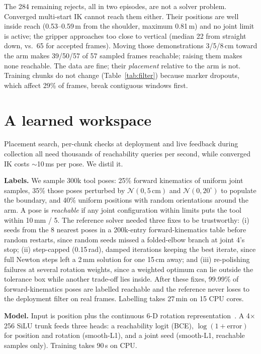 \documentclass[10pt,twocolumn]{article}
\begin{document}
The 284 remaining rejects, all in two episodes, are not a solver problem.
Converged multi-start IK cannot reach them either. Their positions are well
inside reach (0.53--0.59\,m from the shoulder, maximum 0.81\,m) and no joint
limit is active; the gripper approaches too close to vertical (median
22\textdegree{} from straight down, vs.\ 65\textdegree{} for accepted frames).
Moving those demonstrations 3/5/8\,cm toward the arm makes 39/50/57 of 57
sampled frames reachable; raising them makes none reachable. The data are
fine; their \emph{placement} relative to the arm is not. Training chunks do not
change (Table~\ref{tab:filter}) because marker dropouts, which affect 29\% of
frames, break contiguous windows first.

\section{A learned workspace}
Placement search, per-chunk checks at deployment and live feedback during
collection all need thousands of reachability queries per second, while
converged IK costs $\sim$10\,ms per pose. We distil it.

\textbf{Labels.} We sample 300k tool poses: 25\% forward kinematics of uniform
joint samples, 35\% those poses perturbed by $\mathcal{N}(0,5\,\text{cm})$ and
$\mathcal{N}(0,20^\circ)$ to populate the boundary, and 40\% uniform positions with
random orientations around the arm. A pose is \emph{reachable} if any joint
configuration within limits puts the tool within 10\,mm / 5\textdegree. The
reference solver needed three fixes to be trustworthy: (i) seeds from the 8
nearest poses in a 200k-entry forward-kinematics table before random restarts,
since random seeds missed a folded-elbow branch at joint 4's stop;
(ii) step-capped (0.15\,rad), damped iterations keeping the best iterate, since
full Newton steps left a 2\,mm solution for one 15\,cm away; and (iii) re-polishing
failures at several rotation weights, since a weighted optimum can lie outside
the tolerance box while another trade-off lies inside. After these fixes, 99.99\%
of forward-kinematics poses are labelled reachable and the reference never
loses to the deployment filter on real frames. Labelling takes 27\,min on 15 CPU
cores.

\textbf{Model.} Input is position plus the continuous 6-D rotation
representation~\citep{zhou2019continuity}. A 4$\times$256 SiLU trunk feeds three
heads: a reachability logit (BCE), $\log(1+\text{error})$ for position and
rotation (smooth-L1), and a joint seed (smooth-L1, reachable samples only).
Training takes 90\,s on CPU.
\end{document}
